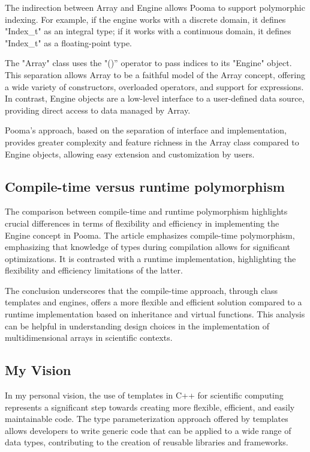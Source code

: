 \documentclass[11pt]{article}
\begin{document}
\begin{multicols*}{2}[\columnsep=1cm]
    The indirection between Array and Engine allows Pooma to support polymorphic indexing. For example, if the engine works with a discrete domain, it defines "Index\_t" as an integral type; if it works with a continuous domain, it defines "Index\_t" as a floating-point type.

    The "Array" class uses the "()” operator to pass indices to its "Engine" object. This separation allows Array to be a faithful model of the Array concept, offering a wide variety of constructors, overloaded operators, and support for expressions. In contrast, Engine objects are a low-level interface to a user-defined data source, providing direct access to data managed by Array.

    Pooma's approach, based on the separation of interface and implementation, provides greater complexity and feature richness in the Array class compared to Engine objects, allowing easy extension and customization by users.


    \subsection{Compile-time versus runtime polymorphism}
        The comparison between compile-time and runtime polymorphism highlights crucial differences in terms of flexibility and efficiency in implementing the Engine concept in Pooma. The article emphasizes compile-time polymorphism, emphasizing that knowledge of types during compilation allows for significant optimizations. It is contrasted with a runtime implementation, highlighting the flexibility and efficiency limitations of the latter.

        The conclusion underscores that the compile-time approach, through class templates and engines, offers a more flexible and efficient solution compared to a runtime implementation based on inheritance and virtual functions. This analysis can be helpful in understanding design choices in the implementation of multidimensional arrays in scientific contexts.
        
    \subsection{My Vision}
        In my personal vision, the use of templates in C++ for scientific computing represents a significant step towards creating more flexible, efficient, and easily maintainable code. The type parameterization approach offered by templates allows developers to write generic code that can be applied to a wide range of data types, contributing to the creation of reusable libraries and frameworks.
        

\end{multicols*}
\end{document}
